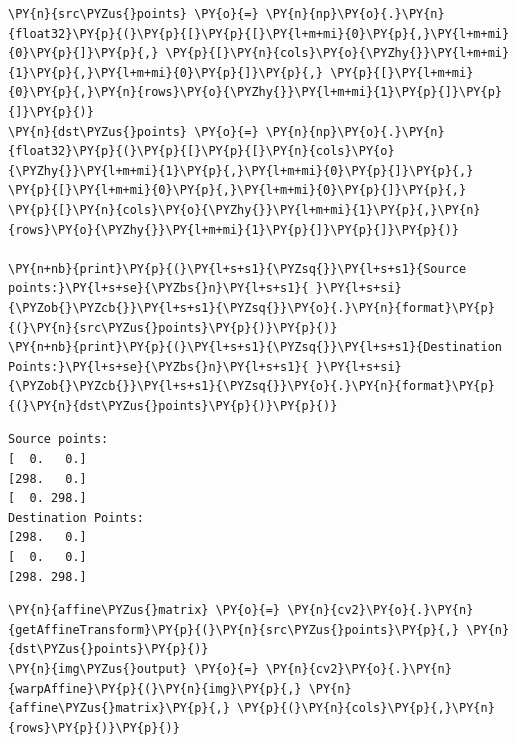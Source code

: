 \begin{tcolorbox}[breakable, size=fbox, boxrule=1pt, pad at break*=1mm,colback=cellbackground, colframe=cellborder]
	\begin{Verbatim}[commandchars=\\\{\}]
\PY{n}{src\PYZus{}points} \PY{o}{=} \PY{n}{np}\PY{o}{.}\PY{n}{float32}\PY{p}{(}\PY{p}{[}\PY{p}{[}\PY{l+m+mi}{0}\PY{p}{,}\PY{l+m+mi}{0}\PY{p}{]}\PY{p}{,} \PY{p}{[}\PY{n}{cols}\PY{o}{\PYZhy{}}\PY{l+m+mi}{1}\PY{p}{,}\PY{l+m+mi}{0}\PY{p}{]}\PY{p}{,} \PY{p}{[}\PY{l+m+mi}{0}\PY{p}{,}\PY{n}{rows}\PY{o}{\PYZhy{}}\PY{l+m+mi}{1}\PY{p}{]}\PY{p}{]}\PY{p}{)}
\PY{n}{dst\PYZus{}points} \PY{o}{=} \PY{n}{np}\PY{o}{.}\PY{n}{float32}\PY{p}{(}\PY{p}{[}\PY{p}{[}\PY{n}{cols}\PY{o}{\PYZhy{}}\PY{l+m+mi}{1}\PY{p}{,}\PY{l+m+mi}{0}\PY{p}{]}\PY{p}{,} \PY{p}{[}\PY{l+m+mi}{0}\PY{p}{,}\PY{l+m+mi}{0}\PY{p}{]}\PY{p}{,} \PY{p}{[}\PY{n}{cols}\PY{o}{\PYZhy{}}\PY{l+m+mi}{1}\PY{p}{,}\PY{n}{rows}\PY{o}{\PYZhy{}}\PY{l+m+mi}{1}\PY{p}{]}\PY{p}{]}\PY{p}{)}

\PY{n+nb}{print}\PY{p}{(}\PY{l+s+s1}{\PYZsq{}}\PY{l+s+s1}{Source points:}\PY{l+s+se}{\PYZbs{}n}\PY{l+s+s1}{ }\PY{l+s+si}{\PYZob{}\PYZcb{}}\PY{l+s+s1}{\PYZsq{}}\PY{o}{.}\PY{n}{format}\PY{p}{(}\PY{n}{src\PYZus{}points}\PY{p}{)}\PY{p}{)}
\PY{n+nb}{print}\PY{p}{(}\PY{l+s+s1}{\PYZsq{}}\PY{l+s+s1}{Destination Points:}\PY{l+s+se}{\PYZbs{}n}\PY{l+s+s1}{ }\PY{l+s+si}{\PYZob{}\PYZcb{}}\PY{l+s+s1}{\PYZsq{}}\PY{o}{.}\PY{n}{format}\PY{p}{(}\PY{n}{dst\PYZus{}points}\PY{p}{)}\PY{p}{)}
	\end{Verbatim}
\end{tcolorbox}

\begin{Verbatim}[commandchars=\\\{\}]
Source points:
[  0.   0.]
[298.   0.]
[  0. 298.]
Destination Points:
[298.   0.]
[  0.   0.]
[298. 298.]
\end{Verbatim}

\begin{tcolorbox}[breakable, size=fbox, boxrule=1pt, pad at break*=1mm,colback=cellbackground, colframe=cellborder]
	\begin{Verbatim}[commandchars=\\\{\}]
\PY{n}{affine\PYZus{}matrix} \PY{o}{=} \PY{n}{cv2}\PY{o}{.}\PY{n}{getAffineTransform}\PY{p}{(}\PY{n}{src\PYZus{}points}\PY{p}{,} \PY{n}{dst\PYZus{}points}\PY{p}{)}
\PY{n}{img\PYZus{}output} \PY{o}{=} \PY{n}{cv2}\PY{o}{.}\PY{n}{warpAffine}\PY{p}{(}\PY{n}{img}\PY{p}{,} \PY{n}{affine\PYZus{}matrix}\PY{p}{,} \PY{p}{(}\PY{n}{cols}\PY{p}{,}\PY{n}{rows}\PY{p}{)}\PY{p}{)}
	\end{Verbatim}
\end{tcolorbox}

